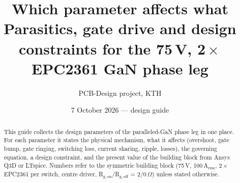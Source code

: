 ﻿\documentclass[10pt,a4paper]{article}
\title{Which parameter affects what\\[2pt]\large Parasitics, gate drive and design constraints for the 75\,V, 2\,$\times$\,EPC2361 GaN phase leg}
\author{PCB-Design project, KTH}
\date{7 October 2026 --- design guide}
\begin{document}
\maketitle

\begin{abstract}
This guide collects the design parameters of the paralleled-GaN phase leg in one place. For each parameter it states the physical mechanism, what it affects (overshoot, gate bump, gate ringing, switching loss, current sharing, ripple, losses), the governing equation, a design constraint, and the present value of the building block from Ansys Q3D or LTspice.
Numbers refer to the symmetric building block (75\,V, 100\,A$_\mathrm{rms}$, 2\,$\times$\,EPC2361 per switch, centre driver, R$_\mathrm{g,on}$/R$_\mathrm{g,off}$ = 2/0\,$\Omega$) unless stated otherwise.
\end{abstract}
\end{document}

